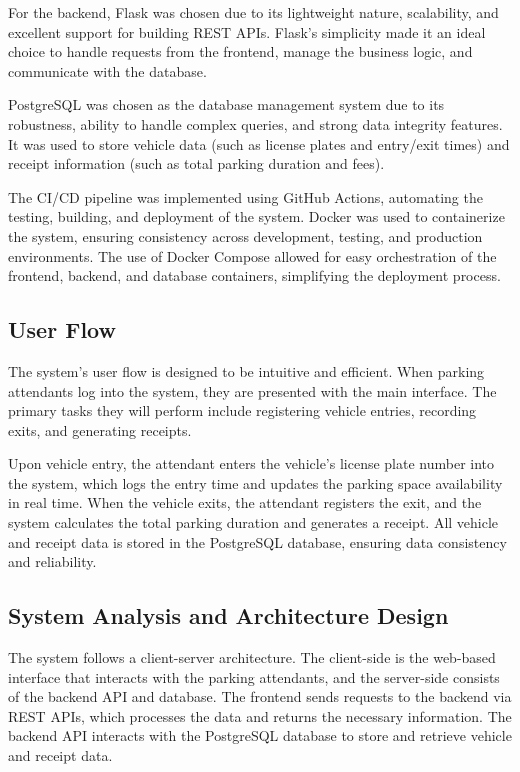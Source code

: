 For the backend, Flask was chosen due to its lightweight nature, scalability, and excellent support for building REST APIs. Flask’s simplicity made it an ideal choice to handle requests from the frontend, manage the business logic, and communicate with the database.

PostgreSQL was chosen as the database management system due to its robustness, ability to handle complex queries, and strong data integrity features. It was used to store vehicle data (such as license plates and entry/exit times) and receipt information (such as total parking duration and fees).

The CI/CD pipeline was implemented using GitHub Actions, automating the testing, building, and deployment of the system. Docker was used to containerize the system, ensuring consistency across development, testing, and production environments. The use of Docker Compose allowed for easy orchestration of the frontend, backend, and database containers, simplifying the deployment process.

\subsection{User Flow}

The system’s user flow is designed to be intuitive and efficient. When parking attendants log into the system, they are presented with the main interface. The primary tasks they will perform include registering vehicle entries, recording exits, and generating receipts.

Upon vehicle entry, the attendant enters the vehicle’s license plate number into the system, which logs the entry time and updates the parking space availability in real time. When the vehicle exits, the attendant registers the exit, and the system calculates the total parking duration and generates a receipt. All vehicle and receipt data is stored in the PostgreSQL database, ensuring data consistency and reliability.

\subsection{System Analysis and Architecture Design}

The system follows a client-server architecture. The client-side is the web-based interface that interacts with the parking attendants, and the server-side consists of the backend API and database. The frontend sends requests to the backend via REST APIs, which processes the data and returns the necessary information. The backend API interacts with the PostgreSQL database to store and retrieve vehicle and receipt data.

